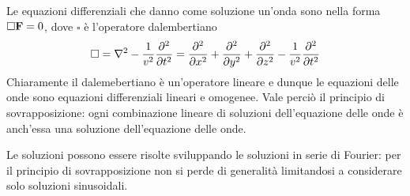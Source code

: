 Le equazioni differenziali che danno come soluzione un'onda sono nella forma $\square\vb{F}=0$,
dove $\square$ è l'operatore dalembertiano
\begin{equation}
    \label{app:eqn:dalembertiano}
    \square=\laplacian - \rec{v^2}\pdv[2]{t}= \pdv[2]{x} + \pdv[2]{y} + \pdv[2]{z} - \rec{v^2}\pdv[2]{t}
\end{equation}
Chiaramente il dalemebertiano è un'operatore lineare e dunque le equazioni delle
onde sono equazioni differenziali lineari e omogenee. Vale perciò il principio di sovrapposizione:
ogni combinazione lineare di soluzioni dell'equazione delle onde è anch'essa una soluzione dell'equazione
delle onde.

Le soluzioni possono essere risolte sviluppando le soluzioni in serie di Fourier: per il principio di
sovrapposizione non si perde di generalità limitandosi a considerare solo soluzioni sinusoidali.
